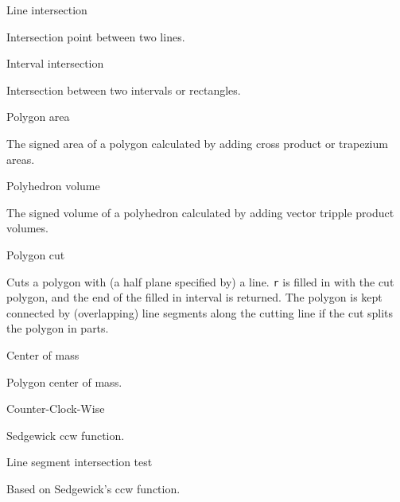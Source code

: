 \begin{algorithm}{Line intersection}

Intersection point between two lines.
\end{algorithm}

\begin{algorithm}{Interval intersection}

Intersection between two intervals or rectangles.
\end{algorithm}

\begin{algorithm}{Polygon area}

The signed area of a polygon calculated by adding cross product or
trapezium areas.
\end{algorithm}

\begin{algorithm}{Polyhedron volume}

The signed volume of a polyhedron calculated by adding vector tripple
product volumes.
\end{algorithm}

\begin{algorithm}{Polygon cut}

Cuts a polygon with (a half plane specified by) a line.
{\tt r} is filled in with the cut polygon, and the end of the filled in
interval is returned. The polygon is kept connected by (overlapping)
line segments along the cutting line if the cut splits the polygon in parts.
\end{algorithm}

\begin{algorithm}{Center of mass}

Polygon center of mass.
\end{algorithm}

\begin{algorithm}{Counter-Clock-Wise}

Sedgewick ccw function.
\end{algorithm}

\begin{algorithm}{Line segment intersection test}

Based on Sedgewick's ccw function.
\end{algorithm}
